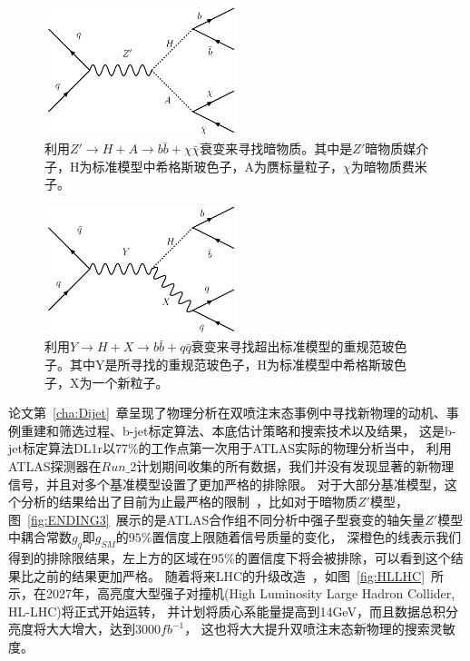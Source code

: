 \begin{figure}
  \begin{center}
    \includegraphics[width=0.5\textwidth]{figuresEND/DMZHA.pdf}
  \end{center}
  \caption{
利用$Z' \to H+A\to b\bar{b}+\chi\bar{\chi}$衰变来寻找暗物质。其中是$Z'$暗物质媒介子，H为标准模型中希格斯玻色子，A为赝标量粒子，$\chi$为暗物质费米子。
  }
    \label{fig:ENDING1}
\end{figure}

\begin{figure}
  \begin{center}
    \includegraphics[width=0.5\textwidth]{figuresEND/YXH.pdf}
  \end{center}
  \caption{
利用$Y\to H+X\to b\bar{b}+q\bar{q}$衰变来寻找超出标准模型的重规范玻色子。其中Y是所寻找的重规范玻色子，H为标准模型中希格斯玻色子，X为一个新粒子。
  }
    \label{fig:ENDING2}
\end{figure}

论文第~\ref{cha:Dijet}~章呈现了物理分析在双喷注末态事例中寻找新物理的动机、事例重建和筛选过程、b-jet标定算法、本底估计策略和搜索技术以及结果，
这是b-jet标定算法DL1r以77\%的工作点第一次用于ATLAS实际的物理分析当中， 
利用ATLAS探测器在$Run\_2$计划期间收集的所有数据，我们并没有发现显著的新物理信号，并且对多个基准模型设置了更加严格的排除限。
对于大部分基准模型，这个分析的结果给出了目前为止最严格的限制~\cite{DIJETSUM}，比如对于暗物质$Z'$模型，
图~\ref{fig:ENDING3}~展示的是ATLAS合作组不同分析中强子型衰变的轴矢量$Z'$模型中耦合常数$g_q$即$g_{SM}$的$95\%$置信度上限随着信号质量的变化，
深橙色的线表示我们得到的排除限结果，左上方的区域在95\%的置信度下将会被排除，可以看到这个结果比之前的结果更加严格。
随着将来LHC的升级改造~\cite{HLLHC}，如图~\ref{fig:HLLHC}~所示，在2027年，高亮度大型强子对撞机(High Luminosity Large Hadron Collider, HL-LHC)将正式开始运转，
并计划将质心系能量提高到14GeV，而且数据总积分亮度将大大增大，达到3000$fb^{-1}$，
这也将大大提升双喷注末态新物理的搜索灵敏度。



